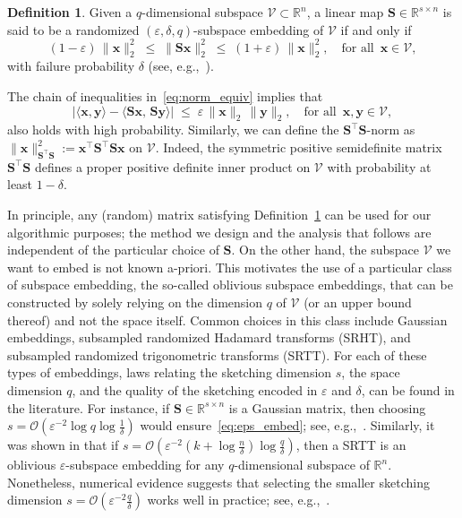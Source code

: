 \documentclass[%
  a4paper,
  onecolumn,
  colorlinks,
]{preprint}
\theoremstyle{plain}
\theoremstyle{definition}
\newtheorem{definition}{Definition}
\newcommand{\R}{\ensuremath{\mathbb{R}}}
\newcommand{\bS}{\ensuremath{\boldsymbol{S}}}
\newcommand{\by}{\mathbf{y}}
\newcommand{\bx}{\mathbf{x}}
\begin{document}
\begin{definition}\label{def:sketch_op}
Given a $q$-dimensional subspace $\mathcal{V}\subset\mathbb{R}^n$, a linear map $\bS \in \R^{s \times n}$ is said to be a randomized $(\varepsilon,\delta,q)$-subspace embedding of $\mathcal{V}$
if and only if
\begin{equation}\label{eq:norm_equiv}
  (1 - \varepsilon)\,\|\bx\|_2^2
  \;\le\; \|\bS\bx\|_2^2
  \;\le\; (1 + \varepsilon)\,\|\bx\|_2^2,
  \quad \text{for all }\, \bx \in \mathcal{V},
\end{equation}
with failure probability $\delta$ (see, e.g.,~\cite[Definition 2.3]{BalabanovGrigori22}). 
\end{definition}
The chain of inequalities in~\eqref{eq:norm_equiv} implies that
\begin{equation}\label{eq:eps_embed}
  \bigl|\langle \bx, \by \rangle
  - \langle \bS\bx,\, \bS\by \rangle\bigr|
  \;\le\; \varepsilon\,\|\bx\|_2\,\|\by\|_2,
  \quad \text{for all }\, \bx, \by \in \mathcal{V},
\end{equation}
also holds with high probability. Similarly, we can define the $\bS^\top\bS$-norm as $\|\bx\|_{\bS^\top\bS}^2:=\bx^\top\bS^\top\bS\bx$ on $\mathcal{V}$. Indeed, the symmetric positive semidefinite matrix $\bS^\top\bS$ defines a proper positive definite inner product on $\mathcal{V}$ with probability at least $1-\delta$.


In principle, any (random) matrix satisfying Definition~\ref{def:sketch_op} can be used
for our algorithmic purposes; the method we design and the analysis that follows
are independent of the particular choice of $\bS$. On the other hand, the subspace $\mathcal{V}$ we want to embed is not known a-priori. This motivates the use of a particular class of subspace embedding, the so-called oblivious subspace embeddings, that can be constructed by solely relying on the dimension $q$ of $\mathcal{V}$ (or an upper bound thereof) and not the space itself.
Common choices in this class include Gaussian embeddings,
subsampled randomized Hadamard transforms (SRHT), and subsampled randomized trigonometric transforms (SRTT).  
For each of these types of embeddings, laws relating the sketching dimension $s$, the space dimension $q$, and the quality of the sketching encoded in $\varepsilon$ and $\delta$, can be found in the literature. For instance, if $\bS\in\mathbb{R}^{s\times n}$ is a Gaussian matrix, then choosing $s=\mathcal{O}(\varepsilon^{-2}\log q\log\frac{1}{\delta})$ would ensure~\eqref{eq:eps_embed}; see, e.g.,~\cite[Theorem 2]{Sarlos06}. Similarly, it was shown in \cite{Tropp11}
 that if $s=\mathcal{O}(\varepsilon^{-2}(k+\log\frac{n}{\delta})\log\frac{q}{\delta})$, then a SRTT is an oblivious $\varepsilon$-subspace
embedding for any $q$-dimensional subspace of $\mathbb{R}^n$.
Nonetheless, numerical evidence suggests that selecting the
smaller sketching dimension 
$s=\mathcal{O}(\varepsilon^{-2}\frac{q}{\delta})$ works well in 
practice; see, e.g.,~\cite[Section~9]{HMT11}.
\end{document}
